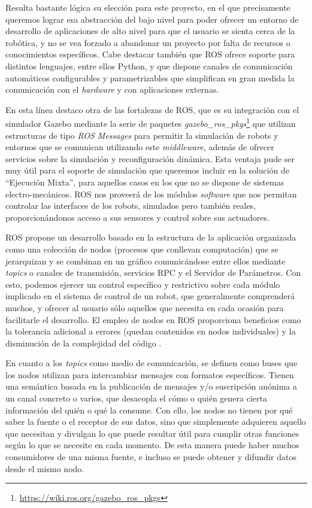 Resulta bastante lógica su elección para este proyecto, en el que precisamente queremos lograr esa abstracción del bajo nivel para poder ofrecer un entorno de desarrollo de aplicaciones de alto nivel para que el usuario se sienta cerca de la robótica, y no se vea forzado a abandonar un proyecto por falta de recursos o conocimientos específicos. Cabe destacar también que ROS ofrece soporte para distintos lenguajes, entre ellos Python, y que dispone canales de comunicación automáticos configurables y parametrizables que simplifican en gran medida la comunicación con el \textit{hardware} y con aplicaciones externas.

En esta línea destaco otra de las fortalezas de ROS, que es su integración con el simulador Gazebo mediante la serie de paquetes \textit{gazebo\_ros\_pkgs}\footnote{\url{https://wiki.ros.org/gazebo\_ros\_pkgs}} que utilizan estructuras de tipo \textit{ROS Messages} para permitir la simulación de robots y entornos que se comunican utilizando este \textit{middleware}, además de ofrecer servicios sobre la simulación y reconfiguración dinámica. Esta ventaja pude ser muy útil para el soporte de simulación que queremos incluir en la solución de ``Ejecución Mixta'', para aquellos casos en los que no se dispone de sistemas electro-mecánicos. ROS nos proveerá de los módulos \textit{software} que nos permitan controlar las interfaces de los robots, simulados pero también reales, proporcionándonos acceso a sus sensores y control sobre sus actuadores.

ROS propone un desarrollo basado en la estructura de la aplicación organizada como una colección de nodos (procesos que conllevan computación) que se jerarquizan y se combinan en un gráfico comunicándose entre ellos mediante \textit{topics} o canales de transmisión, servicios RPC y el Servidor de
Parámetros. Con esto, podemos ejercer un control específico y restrictivo sobre cada módulo implicado en el sistema de control de un robot, que generalmente comprenderá muchos, y ofrecer al usuario sólo aquellos que necesita en cada ocasión para facilitarle el desarrollo. El empleo de nodos en ROS proporciona  beneficios como la tolerancia adicional a errores (quedan contenidos en nodos individuales) y la disminución de la complejidad del código .

En cuanto a los \textit{topics} como medio de comunicación, se definen como buses que los nodos utilizan para intercambiar mensajes con formatos específicos. Tienen una semántica  basada en la publicación de mensajes y/o suscripción anónima a un canal concreto o varios, que desacopla el cómo o quién genera cierta información del quién o qué la consume. Con ello, los nodos no tienen por qué saber la fuente o el receptor de sus datos, sino que simplemente adquieren aquello que necesitan y divulgan lo que puede resultar útil para cumplir otras funciones según lo que se necesite en cada momento. De esta manera puede haber muchos consumidores de una misma fuente, e incluso se puede obtener y difundir datos desde el mismo nodo.

